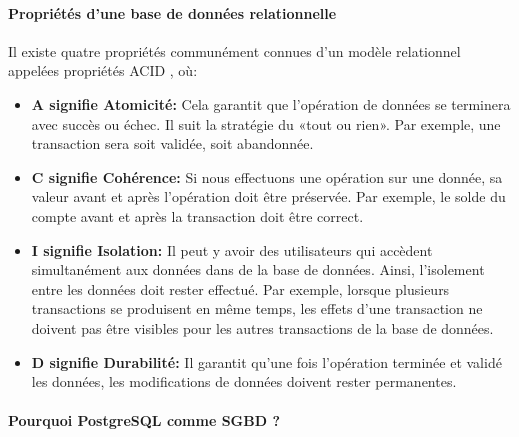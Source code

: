          \paragraph{Propriétés d'une base de données relationnelle}
         Il existe quatre propriétés communément connues d'un modèle relationnel appelées propriétés ACID \cite{typedb}, où:
         \begin{itemize}
                 \item \textbf{A signifie Atomicité: }
                  Cela garantit que l'opération de données se terminera 
                 avec succès ou échec. Il suit la stratégie du «tout ou rien». Par exemple, 
                 une transaction sera soit validée, soit abandonnée.
                 \item \textbf{C signifie Cohérence: }
                  Si nous effectuons une opération sur une donnée, 
                 sa valeur avant et après l'opération doit être préservée. Par exemple, 
                 le solde du compte avant et après la transaction doit être correct.
                 \item \textbf{I signifie Isolation: }
                 Il peut y avoir des utilisateurs  
                 qui accèdent simultanément aux données dans de la base de données. 
                 Ainsi, l'isolement entre les données doit rester effectué. Par exemple, 
                 lorsque plusieurs transactions se produisent en même temps, les effets 
                 d'une transaction ne doivent pas être visibles pour les autres 
                 transactions de la base de données.
                 \item \textbf{D signifie Durabilité: }
                 Il garantit qu'une fois l'opération terminée et validé les données, 
                 les modifications de données doivent rester permanentes.

         \end{itemize}
         \paragraph{Pourquoi PostgreSQL comme SGBD ?}
